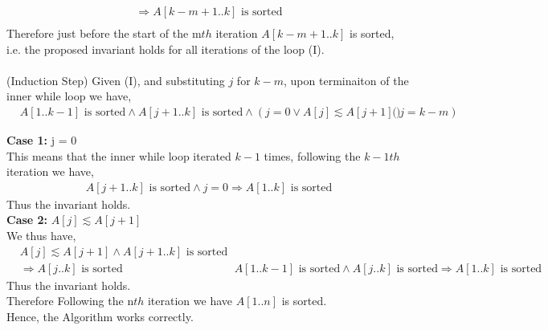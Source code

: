 \documentclass[12pt]{article}
\newenvironment{lemma}[2][Lemma]{\begin{trivlist}
\item[\hskip \labelsep {\bfseries #1}\hskip \labelsep {\bfseries #2.}]}{\end{trivlist}}
\newenvironment{question}[2][Question]{\begin{trivlist}
\item[\hskip \labelsep {\bfseries #1}\hskip \labelsep {\bfseries #2.}]}{\end{trivlist}}
\begin{document}
\begin{question}{1 (b)}
\begin{lemma}{1.4}
\begin{align*}
      & \Rightarrow A[k-m+1..k] \text{ is sorted} &\\
    \end{align*}
    Therefore just before the start of the m$th$ iteration $A[k-m+1..k]$ is sorted,
    i.e. the proposed invariant holds for all iterations of the loop (I).\\ \\
    (Induction Step) Given (I), and substituting $j$ for $k-m$, upon terminaiton
    of the inner while loop we have,
    \begin{align*}
      & A[1..k-1] \text{ is sorted} \land A[j + 1..k] \text{ is sorted} \land (j = 0 \lor A[j] \lesssim A[j + 1]) & (j = k - m)
    \end{align*}

    \textbf{Case 1:} j = 0\\
    This means that the inner while loop iterated $k-1$ times, following the
    $k-1th$ iteration we have,
    \begin{align*}
      A[j + 1..k] \text{ is sorted} \land j = 0 \Rightarrow A[1..k] \text{ is sorted}
    \end{align*}
    Thus the invariant holds. \\

    \textbf{Case 2:} $A[j] \lesssim A[j + 1]$ \\
    We thus have,
    \begin{align*}
      & A[j] \lesssim A[j + 1] \land A[j + 1..k] \text{ is sorted} & \\
      & \Rightarrow A[j..k] \text{ is sorted} &
      & A[1..k-1] \text{ is sorted} \land A[j..k] \text{ is sorted} \Rightarrow A[1..k] \text{ is sorted}
    \end{align*}
    Thus the invariant holds.\\
    Therefore Following the n$th$ iteration we have $A[1..n]$ is sorted.\\
    Hence, the Algorithm works correctly.
  \end{lemma}


\end{question}
\end{document}
